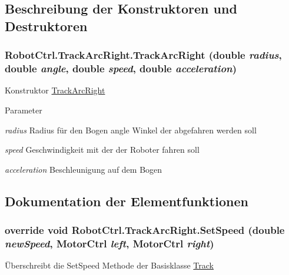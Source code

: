 \subsection{Beschreibung der Konstruktoren und Destruktoren}
\hypertarget{class_robot_ctrl_1_1_track_arc_right_a54609ff71d77c37e9423cae42de7c347}{
\subsubsection[{TrackArcRight}]{\setlength{\rightskip}{0pt plus 5cm}RobotCtrl.TrackArcRight.TrackArcRight (double {\em radius}, \/  double {\em angle}, \/  double {\em speed}, \/  double {\em acceleration})}}
\label{class_robot_ctrl_1_1_track_arc_right_a54609ff71d77c37e9423cae42de7c347}
Konstruktor \hyperlink{class_robot_ctrl_1_1_track_arc_right}{TrackArcRight}


\begin{DoxyParams}{Parameter}
\item[{\em radius}]Radius f\"{u}r den Bogen  angle Winkel der abgefahren werden soll \item[{\em speed}]Geschwindigkeit mit der der Roboter fahren soll \item[{\em acceleration}]Beschleunigung auf dem Bogen \end{DoxyParams}


\subsection{Dokumentation der Elementfunktionen}
\hypertarget{class_robot_ctrl_1_1_track_arc_right_a7b2db0d3709e4919da0645a6713a87bb}{
\subsubsection[{SetSpeed}]{\setlength{\rightskip}{0pt plus 5cm}override void RobotCtrl.TrackArcRight.SetSpeed (double {\em newSpeed}, \/  {\bf MotorCtrl} {\em left}, \/  {\bf MotorCtrl} {\em right})}}
\label{class_robot_ctrl_1_1_track_arc_right_a7b2db0d3709e4919da0645a6713a87bb}
\"{U}berschreibt die SetSpeed Methode der Basisklasse \hyperlink{class_robot_ctrl_1_1_track}{Track}


